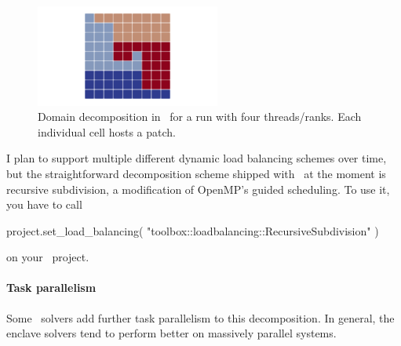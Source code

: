 \begin{figure}
 \begin{center}
  \includegraphics[width=0.54\textwidth]{60_exahype/domain-decomposition.png}
 \end{center}
 \caption{
  Domain decomposition in \ExaHyPE\ for a run with four threads/ranks. Each
  individual cell hosts a patch.
 }
\end{figure}


I plan to support multiple different dynamic load balancing schemes over time,
but the straightforward decomposition scheme shipped with \Peano\ at the moment
is recursive subdivision, a modification of OpenMP's guided scheduling.
To use it, you have to call
\begin{code}
project.set_load_balancing( "toolbox::loadbalancing::RecursiveSubdivision" )
\end{code}

\noindent
on your \ExaHyPE\ project. 


\paragraph{Task parallelism}

Some \ExaHyPE\ solvers add further task parallelism to this decomposition. 
In general, the enclave solvers tend to perform better on massively parallel
systems.


% 


